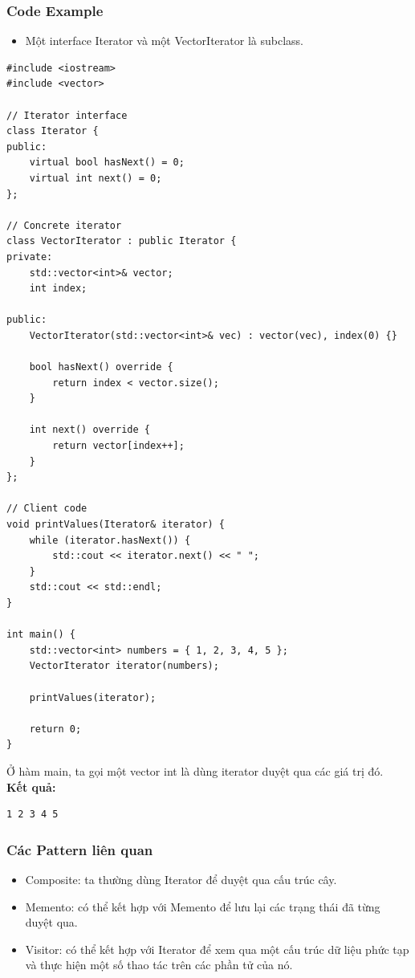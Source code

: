 \subsubsection{Code Example}
\begin{itemize}
    \item Một interface Iterator và một VectorIterator là subclass.
\end{itemize}
\begin{lstlisting}
#include <iostream>
#include <vector>

// Iterator interface
class Iterator {
public:
    virtual bool hasNext() = 0;
    virtual int next() = 0;
};

// Concrete iterator
class VectorIterator : public Iterator {
private:
    std::vector<int>& vector;
    int index;

public:
    VectorIterator(std::vector<int>& vec) : vector(vec), index(0) {}

    bool hasNext() override {
        return index < vector.size();
    }

    int next() override {
        return vector[index++];
    }
};

// Client code
void printValues(Iterator& iterator) {
    while (iterator.hasNext()) {
        std::cout << iterator.next() << " ";
    }
    std::cout << std::endl;
}

int main() {
    std::vector<int> numbers = { 1, 2, 3, 4, 5 };
    VectorIterator iterator(numbers);

    printValues(iterator);

    return 0;
}

\end{lstlisting}
Ở hàm main, ta gọi một vector int là dùng iterator duyệt qua các giá trị đó.\\
\newline
\textbf{Kết quả:}
\begin{lstlisting}
1 2 3 4 5 
\end{lstlisting}
\subsubsection{Các Pattern liên quan}
\begin{itemize}
    \item Composite: ta thường dùng Iterator để duyệt qua cấu trúc cây.
    \item Memento: có thể kết hợp với Memento để lưu lại các trạng thái đã từng duyệt qua.
    \item Visitor: có thể kết hợp với Iterator để xem qua một cấu trúc dữ liệu phức tạp và thực hiện một số thao tác trên các phần tử của nó.
\end{itemize}

